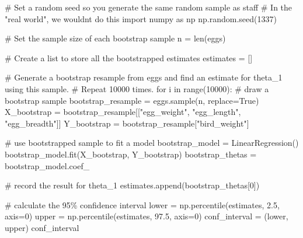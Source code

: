 \documentclass[
  letterpaper,
  DIV=11,
  numbers=noendperiod]{scrreprt}
\newenvironment{Shaded}{\begin{snugshade}}{\end{snugshade}}
\newcommand{\BuiltInTok}[1]{\textcolor[rgb]{0.00,0.23,0.31}{#1}}
\newcommand{\CommentTok}[1]{\textcolor[rgb]{0.37,0.37,0.37}{#1}}
\newcommand{\ControlFlowTok}[1]{\textcolor[rgb]{0.00,0.23,0.31}{#1}}
\newcommand{\DecValTok}[1]{\textcolor[rgb]{0.68,0.00,0.00}{#1}}
\newcommand{\FloatTok}[1]{\textcolor[rgb]{0.68,0.00,0.00}{#1}}
\newcommand{\ImportTok}[1]{\textcolor[rgb]{0.00,0.46,0.62}{#1}}
\newcommand{\KeywordTok}[1]{\textcolor[rgb]{0.00,0.23,0.31}{#1}}
\newcommand{\NormalTok}[1]{\textcolor[rgb]{0.00,0.23,0.31}{#1}}
\newcommand{\OperatorTok}[1]{\textcolor[rgb]{0.37,0.37,0.37}{#1}}
\newcommand{\StringTok}[1]{\textcolor[rgb]{0.13,0.47,0.30}{#1}}
\newcommand{\VariableTok}[1]{\textcolor[rgb]{0.07,0.07,0.07}{#1}}
\begin{document}
\begin{Shaded}
\begin{Highlighting}[]
\CommentTok{\# Set a random seed so you generate the same random sample as staff}
\CommentTok{\# In the "real world", we wouldn\textquotesingle{}t do this}
\ImportTok{import}\NormalTok{ numpy }\ImportTok{as}\NormalTok{ np}
\NormalTok{np.random.seed(}\DecValTok{1337}\NormalTok{)}

\CommentTok{\# Set the sample size of each bootstrap sample}
\NormalTok{n }\OperatorTok{=} \BuiltInTok{len}\NormalTok{(eggs)}

\CommentTok{\# Create a list to store all the bootstrapped estimates}
\NormalTok{estimates }\OperatorTok{=}\NormalTok{ []}

\CommentTok{\# Generate a bootstrap resample from \textasciigrave{}eggs\textasciigrave{} and find an estimate for theta\_1 using this sample. }
\CommentTok{\# Repeat 10000 times.}
\ControlFlowTok{for}\NormalTok{ i }\KeywordTok{in} \BuiltInTok{range}\NormalTok{(}\DecValTok{10000}\NormalTok{):}
    \CommentTok{\# draw a bootstrap sample}
\NormalTok{    bootstrap\_resample }\OperatorTok{=}\NormalTok{ eggs.sample(n, replace}\OperatorTok{=}\VariableTok{True}\NormalTok{)}
\NormalTok{    X\_bootstrap }\OperatorTok{=}\NormalTok{ bootstrap\_resample[[}\StringTok{"egg\_weight"}\NormalTok{, }\StringTok{"egg\_length"}\NormalTok{, }\StringTok{"egg\_breadth"}\NormalTok{]]}
\NormalTok{    Y\_bootstrap }\OperatorTok{=}\NormalTok{ bootstrap\_resample[}\StringTok{"bird\_weight"}\NormalTok{]}
    
    \CommentTok{\# use bootstrapped sample to fit a model}
\NormalTok{    bootstrap\_model }\OperatorTok{=}\NormalTok{ LinearRegression()}
\NormalTok{    bootstrap\_model.fit(X\_bootstrap, Y\_bootstrap)}
\NormalTok{    bootstrap\_thetas }\OperatorTok{=}\NormalTok{ bootstrap\_model.coef\_}
    
    \CommentTok{\# record the result for theta\_1}
\NormalTok{    estimates.append(bootstrap\_thetas[}\DecValTok{0}\NormalTok{])}
    
\CommentTok{\# calculate the 95\% confidence interval }
\NormalTok{lower }\OperatorTok{=}\NormalTok{ np.percentile(estimates, }\FloatTok{2.5}\NormalTok{, axis}\OperatorTok{=}\DecValTok{0}\NormalTok{)}
\NormalTok{upper }\OperatorTok{=}\NormalTok{ np.percentile(estimates, }\FloatTok{97.5}\NormalTok{, axis}\OperatorTok{=}\DecValTok{0}\NormalTok{)}
\NormalTok{conf\_interval }\OperatorTok{=}\NormalTok{ (lower, upper)}
\NormalTok{conf\_interval}
\end{Highlighting}
\end{Shaded}
\end{document}
